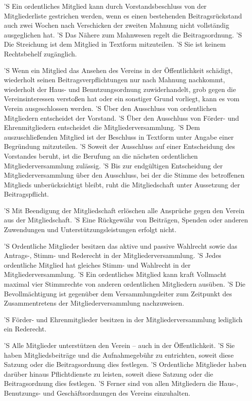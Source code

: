 \documentclass[a4paper,10pt]{scrreprt}
\begin{document}
\begin{contract}
'S Ein ordentliches Mitglied kann durch Vorstandsbeschluss von der
Mitgliederliste gestrichen werden, wenn es einen bestehenden Beitragsrückstand
auch zwei Wochen nach Verschicken der zweiten Mahnung nicht vollständig
ausgeglichen hat.
'S Das Nähere zum Mahnwesen regelt die Beitragsordnung.
'S Die Streichung ist dem Mitglied in Textform mitzuteilen.
'S Sie ist keinem Rechtsbehelf zugänglich.

'S Wenn ein Mitglied das Ansehen des Vereins in der Öffentlichkeit schädigt,
wiederholt seinen Beitragsverpflichtungen nur nach Mahnung nachkommt,
wiederholt der Haus- und Benutzungsordnung zuwiderhandelt, grob gegen die
Vereinsinteressen verstoßen hat oder ein sonstiger Grund vorliegt, kann es vom
Verein ausgeschlossen werden.
'S Über den Ausschluss von ordentlichen Mitgliedern entscheidet der Vorstand.
'S Über den Ausschluss von Förder- und Ehrenmitgliedern entscheidet die
Mitgliederversammlung.
'S Dem auszuschließenden Mitglied ist der Beschluss in Textform unter Angabe
einer Begründung mitzuteilen.
'S Soweit der Ausschluss auf einer Entscheidung des Vorstandes beruht, ist die
Berufung an die nächsten ordentlichen Mitgliederversammlung zulässig.
'S Bis zur endgültigen Entscheidung der Mitgliederversammlung über den
Ausschluss, bei der die Stimme des betroffenen Mitglieds unberücksichtigt
bleibt, ruht die Mitgliedschaft unter Aussetzung der Beitragspflicht.

'S Mit Beendigung der Mitgliedschaft erlöschen alle Ansprüche gegen den Verein
aus der Mitgliedschaft.
'S Eine Rückgewähr von Beiträgen, Spenden oder anderen Zuwendungen und
Unterstützungsleistungen erfolgt nicht.


'S Ordentliche Mitglieder besitzen das aktive und passive Wahlrecht sowie das
Antrags-, Stimm- und Rederecht in der Mitgliederversammlung.
'S Jedes ordentliche Mitglied hat gleiches Stimm- und Wahlrecht in der
Mitgliederversammlung.
'S Ein ordentliches Mitglied kann kraft Vollmacht maximal vier Stimmrechte von
anderen ordentlichen Mitgliedern ausüben.
'S Die Bevollmächtigung ist gegenüber dem Versammlungsleiter zum Zeitpunkt des
Zusammentretens der Mitgliederversammlung nachzuweisen.

'S Förder- und Ehrenmitglieder besitzen in der Mitgliederversammlung lediglich
ein Rederecht.

'S Alle Mitglieder unterstützen den Verein – auch in der Öffentlichkeit.
'S Sie haben Mitgliedsbeiträge und die Aufnahmegebühr zu entrichten, soweit
diese Satzung oder die Beitragsordnung dies festlegen.
'S Ordentliche Mitglieder haben darüber hinaus Pflichtdienste zu leisten,
soweit diese Satzung oder die Beitragsordnung dies festlegen.
'S Ferner sind von allen Mitgliedern die Haus-, Benutzungs- und
Geschäftsordnungen des Vereins einzuhalten.


\end{contract}
\end{document}
